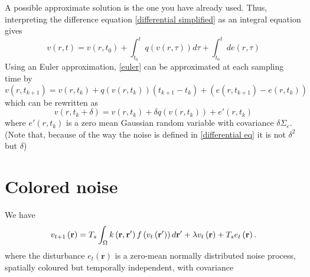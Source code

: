 \documentclass[onecolumn,draftcls]{IEEEtran}
\begin{document}
A possible approximate solution is the one you have already used. Thus, interpreting the difference equation \ref{differential simplified} as an integral equation gives
\begin{equation}\label{euler}
	v\left(r,t\right) =  v(r,t_0) + \int_{t_0}^{t} q\left(v(r,\tau) \right) d\tau  + \int_{t_0}^{t} d e\left(r,\tau\right)
\end{equation}
Using an Euler approximation, \ref{euler} can be approximated at each sampling time by
\begin{equation}\label{euler approx 1}
	v\left(r,t_{k+1} \right) =  v(r,t_k) + q\left(v(r,t_k)\right) (t_{k+1} - t_k) + (e(r,t_{k+1}) - e(r,t_k))
\end{equation}
which can be rewritten as
\begin{equation}\label{euler approx 2}
	v\left(r,t_k + \delta \right) =  v(r,t_k) + \delta q\left(v(r,t_k)\right) + e'(r,t_k)
\end{equation}
where $e'(r,t_k)$ is a zero mean Gaussian random variable with covariance $\delta\Sigma_e$. (Note that, because of the way the noise is defined in \ref{differential eq} it is not $\delta^2$ but $\delta$)

\section{Colored noise}
We have
\begin{equation}
v_{t + 1}\left( \mathbf{r} \right)  = T_s\int_\Omega  {k\left( {{\bf{r}} , {\bf{r'}}} \right)f\left( {{v_t}\left( \bf{r'} \right)} \right)d{\bf{r'}}} + \lambda v_t\left( {\bf{r}} \right) + T_se_t\left( {\mathbf{r}} \right).
\end{equation}
where the disturbance $e_t(\mathbf r)$ is a zero-mean normally distributed noise process, spatially coloured but temporally independent, with covariance 
\end{document}
